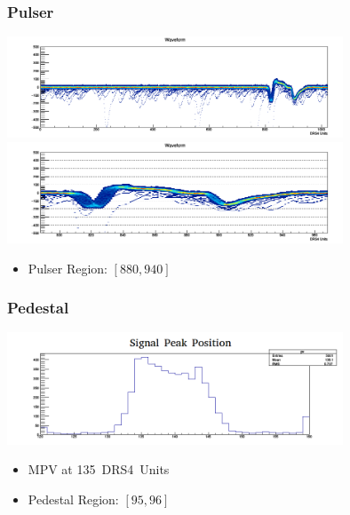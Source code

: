 \documentclass[9pt]{beamer}
\begin{document}
\begin{frame}
	\frametitle{Pulser}
	\begin{center}
		\includegraphics[width=10cm]{WF2}\\
		\includegraphics[width=10cm]{WF3}\\
	\end{center}
	\begin{itemize}
		\item Pulser Region: $[880,940]$
	\end{itemize}
\end{frame}
\begin{frame}
	\frametitle{Pedestal}
	\begin{center}
		\includegraphics[width=10cm]{PeakValues}
	\end{center}
	\begin{itemize}
		\item MPV at \SI{135}{DRS4 Units}
		\item Pedestal Region: $[95,96]$
	\end{itemize}
\end{frame}
\end{document}
